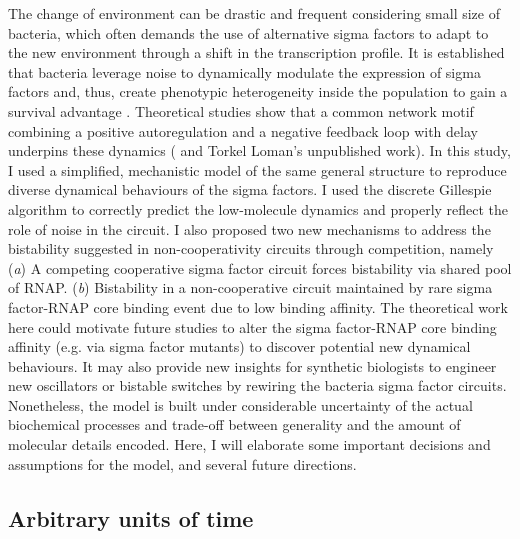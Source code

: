 The change of environment can be drastic and frequent considering
small size of bacteria,
which often demands the use of alternative sigma factors to adapt
to the new environment through a shift in the transcription profile.
It is established that bacteria leverage noise to dynamically modulate
the expression of sigma factors and, thus, create phenotypic
heterogeneity inside the population to gain a survival advantage
\cite{locke11,cabeen17,park18a,schwall21a}.
Theoretical studies show that a common network motif combining 
a positive autoregulation and a negative feedback loop with delay
underpins these dynamics (\cite{schwall21a} and Torkel Loman's
unpublished work).
In this study, I used a simplified, mechanistic model of the same 
general structure to reproduce diverse dynamical behaviours of
the sigma factors.
I used the discrete Gillespie algorithm to correctly predict the 
low-molecule dynamics and properly reflect the role of noise
in the circuit.
I also proposed two new mechanisms to address the bistability
suggested in non-cooperativity circuits \cite{schwall21a}
through competition, namely
(\textit{a}) A competing cooperative sigma factor circuit forces
bistability via shared pool of RNAP.
(\textit{b}) Bistability in a non-cooperative circuit
maintained by rare sigma factor-RNAP core
binding event due to low binding affinity.
The theoretical work here could motivate future studies to alter the 
sigma factor-RNAP core binding affinity (e.g. via sigma factor mutants)
to discover potential new dynamical behaviours.
It may also provide new insights for synthetic biologists to engineer
new oscillators or bistable switches by rewiring the 
bacteria sigma factor circuits.
Nonetheless, the model is built under considerable uncertainty of the
actual biochemical processes and trade-off between generality
and the amount of molecular details encoded.
Here, I will elaborate some important decisions and assumptions
for the model, and several future directions.

\subsection{Arbitrary units of time}
\label{sec:arbitrary_units_time}


